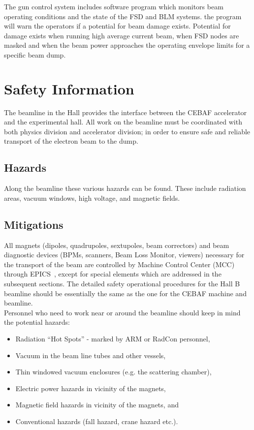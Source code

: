 {The gun control system includes software program which monitors beam 
operating conditions and the state of the FSD and BLM systems. the program 
will warn the operators if a potential for beam damage exists. Potential for 
damage exists when running high average current beam, when FSD nodes are 
masked and when the beam power approaches the operating envelope limits for a 
specific beam dump.


\section{Safety Information}

}



%
%

The beamline in the Hall provides the interface between the CEBAF accelerator
and the experimental hall.   All work on the beamline must be coordinated 
with both physics division and accelerator division; in order to ensure
safe and reliable transport of the electron beam to the dump.

\subsection{Hazards}

Along the beamline these various hazards can be found.  These include
radiation areas, vacuum windows, high voltage, and magnetic fields.

\subsection{Mitigations}

All magnets (dipoles, quadrupoles, sextupoles, beam correctors) and beam 
diagnostic devices (BPMs, scanners, Beam Loss Monitor, viewers) necessary for 
the transport of the beam are controlled by Machine Control Center (MCC) 
through EPICS~\cite{EPICSwww}, except for special elements which are addressed in the 
subsequent sections. The detailed safety operational procedures for the Hall 
B beamline should be essentially the same as the one for the CEBAF machine 
and beamline.\\ 
  
\noindent{}Personnel who need to work near or around the beamline should keep in mind the potential hazards:
\begin{itemize}
  \item Radiation ``Hot Spots'' - marked by ARM or RadCon personnel,
  \item Vacuum in the beam line tubes and other vessels,
  \item Thin windowed vacuum enclosures (e.g. the scattering chamber),
  \item Electric power hazards in vicinity of the magnets,
  \item Magnetic field hazards in vicinity of the magnets, and
  \item Conventional hazards (fall hazard, crane hazard etc.).
\end{itemize}

